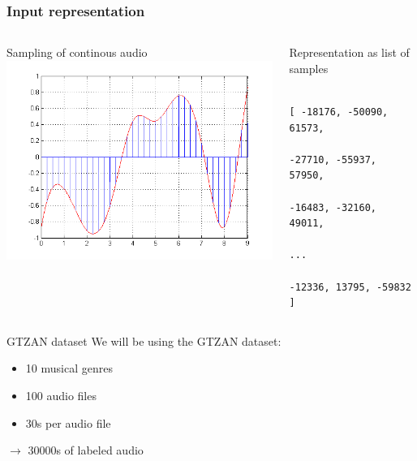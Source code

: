 \documentclass[aspectratio=169]{beamer}
\begin{document}
	\begin{frame}[fragile]
		\frametitle{Input representation}
		\begin{columns}[T]
		    \begin{column}{.5\textwidth}
		    	\begin{block}{Sampling of continous audio}
					\includegraphics[width=\textwidth]{images/signal_sampling.png}
		   		\end{block}
		    \end{column}
		    \begin{column}{.5\textwidth}
		    	\begin{block}{Representation as list of samples}
		    		\begin{verbatim}
		    			[ -18176, -50090, 61573,
		    			  -27710, -55937, 57950,
		    			  -16483, -32160, 49011,
		    			  ...
		    			  -12336, 13795, -59832 ]
		    		\end{verbatim}
		    	\end{block}
		    \end{column}
		  \end{columns}
	\end{frame}

	\begin{frame}{GTZAN dataset}
		We will be using the GTZAN dataset:
		\vfill
		\begin{itemize}
			\item 10 musical genres
			\item 100 audio files
			\item 30s per audio file
		\end{itemize}
		\vfill
		$\rightarrow$ 30000s of labeled audio
	\end{frame}
\end{document}
